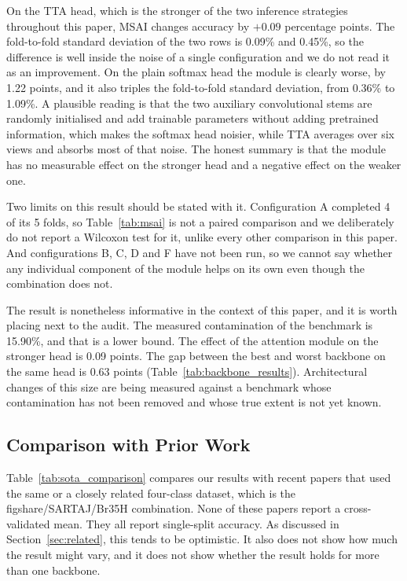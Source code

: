 \documentclass[11pt]{article}
\begin{document}
On the TTA head, which is the stronger of the two inference strategies throughout this paper, MSAI changes accuracy by $+0.09$ percentage points. The fold-to-fold standard deviation of the two rows is 0.09\% and 0.45\%, so the difference is well inside the noise of a single configuration and we do not read it as an improvement. On the plain softmax head the module is clearly worse, by 1.22 points, and it also triples the fold-to-fold standard deviation, from 0.36\% to 1.09\%. A plausible reading is that the two auxiliary convolutional stems are randomly initialised and add trainable parameters without adding pretrained information, which makes the softmax head noisier, while TTA averages over six views and absorbs most of that noise. The honest summary is that the module has no measurable effect on the stronger head and a negative effect on the weaker one.

Two limits on this result should be stated with it. Configuration A completed 4 of its 5 folds, so Table~\ref{tab:msai} is not a paired comparison and we deliberately do not report a Wilcoxon test for it, unlike every other comparison in this paper. And configurations B, C, D and F have not been run, so we cannot say whether any individual component of the module helps on its own even though the combination does not.

The result is nonetheless informative in the context of this paper, and it is worth placing next to the audit. The measured contamination of the benchmark is 15.90\%, and that is a lower bound. The effect of the attention module on the stronger head is 0.09 points. The gap between the best and worst backbone on the same head is 0.63 points (Table~\ref{tab:backbone_results}). Architectural changes of this size are being measured against a benchmark whose contamination has not been removed and whose true extent is not yet known.

\subsection{Comparison with Prior Work}
\label{sec:sota}

Table~\ref{tab:sota_comparison} compares our results with recent papers that used the same or a closely related four-class dataset, which is the figshare/SARTAJ/Br35H combination. None of these papers report a cross-validated mean. They all report single-split accuracy. As discussed in Section~\ref{sec:related}, this tends to be optimistic. It also does not show how much the result might vary, and it does not show whether the result holds for more than one backbone.
\end{document}
